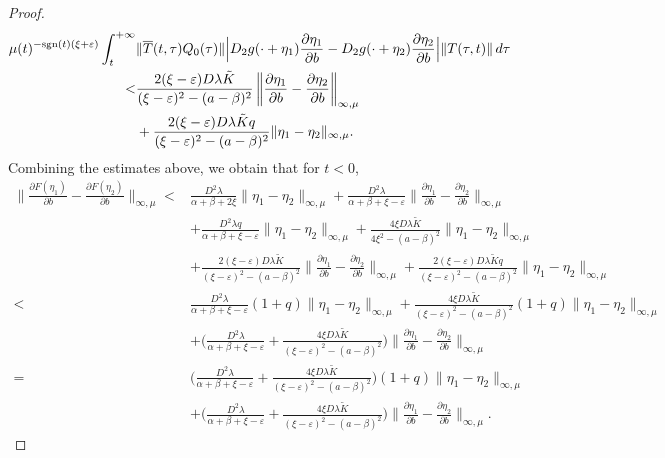 \documentclass[9pt]{amsart}
\numberwithin{equation}{section}
\numberwithin{lemma}{section}
\begin{document}
\begin{proof}
\begin{equation*}
\begin{split}
\mu(t)^{-\textnormal{sgn}(t)(\xi+\varepsilon)} \int_{t}^{+\infty} & \|\overline{T}(t,\tau)Q_0(\tau)\|
\Big| D_2g(\cdot + \eta_1) \frac{\partial\eta_1}{\partial b} - D_2g(\cdot + \eta_2) \frac{\partial\eta_2}{\partial b} \Big|
\|T(\tau,t)\| \, d\tau
\\
< & \frac{2(\xi-\varepsilon)D\lambda\tilde{K}}{(\xi-\varepsilon)^2 - (a-\beta)^2} \left\| \frac{\partial\eta_1}{\partial b} - \frac{\partial\eta_2}{\partial b} \right\|_{\infty,\mu} \\
&+ \frac{2(\xi-\varepsilon)D\lambda\tilde{K}q}{(\xi-\varepsilon)^2 - (a-\beta)^2} \|\eta_1 - \eta_2\|_{\infty,\mu}.
\end{split}
\end{equation*}
Combining the estimates above, we obtain that for $t < 0$,
\begin{align}
        \Big\|\frac{\partial F(\eta_1)}{\partial b}-\frac{\partial F(\eta_2)}{\partial b}\Big\|_{\infty,\mu} <& \frac{D^2\lambda}{\alpha+\beta+2\xi}\|\eta_1-\eta_2\|_{\infty,\mu}+\frac{D^2\lambda}{\alpha+\beta+\xi-\varepsilon}\Big\|\frac{\partial\eta_1}{\partial b}-\frac{\partial\eta_2}{\partial b}\Big\|_{\infty,\mu}\nonumber\\
        &+\frac{D^2\lambda q}{\alpha+\beta+\xi-\varepsilon}\|\eta_1-\eta_2\|_{\infty,\mu} + \frac{4\xi D\lambda\tilde{K}}{4\xi^2-(a-\beta)^2}\|\eta_1-\eta_2\|_{\infty,\mu}\nonumber\\
        &+ \frac{2(\xi-\varepsilon)D\lambda\tilde{K}}{(\xi-\varepsilon)^2-(a-\beta)^2}\Big\|\frac{\partial\eta_1}{\partial b}-\frac{\partial\eta_2}{\partial b}\Big\|_{\infty,\mu} + \frac{2(\xi-\varepsilon)D\lambda\tilde{K}q}{(\xi-\varepsilon)^2-(a-\beta)^2}\|\eta_1-\eta_2\|_{\infty,\mu}\nonumber\\
        <& \frac{D^2\lambda}{\alpha+\beta+\xi-\varepsilon}(1+q)\|\eta_1-\eta_2\|_{\infty,\mu} + \frac{4\xi D\lambda\tilde{K}}{(\xi-\varepsilon)^2-(a-\beta)^2}(1+q)\|\eta_1-\eta_2\|_{\infty,\mu}\nonumber\\
        &+ \Big(\frac{D^2\lambda}{\alpha+\beta+\xi-\varepsilon}+\frac{4\xi D\lambda\tilde{K}}{(\xi-\varepsilon)^2-(a-\beta)^2}\Big)\Big\|\frac{\partial\eta_1}{\partial b} - \frac{\partial\eta_2}{\partial b}\Big\|_{\infty,\mu}\nonumber\\
        =& \Big(\frac{D^2\lambda}{\alpha+\beta+\xi-\varepsilon}+\frac{4\xi D\lambda\tilde{K}}{(\xi-\varepsilon)^2-(a-\beta)^2}\Big)(1+q)\|\eta_1-\eta_2\|_{\infty,\mu}\nonumber\\
        &+ \Big(\frac{D^2\lambda}{\alpha+\beta+\xi-\varepsilon}+\frac{4\xi D\lambda\tilde{K}}{(\xi-\varepsilon)^2-(a-\beta)^2}\Big)\Big\|\frac{\partial\eta_1}{\partial b} - \frac{\partial\eta_2}{\partial b}\Big\|_{\infty,\mu}.\label{Dfn12-tmenorcero}
\end{align}


\end{proof}
\end{document}
